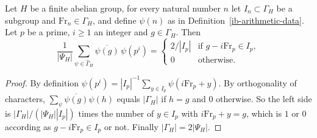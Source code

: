 \begin{lemma}\label{ib-prime-power-orthogonality}
Let $H$ be a finite abelian group, for every natural number $n$ let
$I_n\subset\Gamma_H$ be a subgroup and $\mathrm{Fr}_n\in\Gamma_H$, and define
$\psi(n)$ as in Definition~\ref{ib-arithmetic-data}. Let $p$ be a prime, $i\geq1$
an integer and $g\in\Gamma_H$. Then
\[
 \frac1{|\Psi_H|}\sum_{\psi\in\widehat\Gamma_H}\overline{\psi(g)}\,\psi(p^i)
 =\begin{cases}2/|I_p|&\text{if }g-i\mathrm{Fr}_p\in I_p,\\
 0&\text{otherwise.}\end{cases}
\]
\end{lemma}
\begin{proof}
By definition $\psi(p^i)=|I_p|^{-1}\sum_{y\in I_p}\psi(i\mathrm{Fr}_p+y)$. By
orthogonality of characters,
$\sum_\psi\overline{\psi(g)}\psi(h)$ equals $|\Gamma_H|$ if $h=g$ and $0$
otherwise. So the left side is $|\Gamma_H|/(|\Psi_H||I_p|)$ times the number of
$y\in I_p$ with $i\mathrm{Fr}_p+y=g$, which is $1$ or $0$ according as
$g-i\mathrm{Fr}_p\in I_p$ or not. Finally $|\Gamma_H|=2|\Psi_H|$.
\end{proof}

